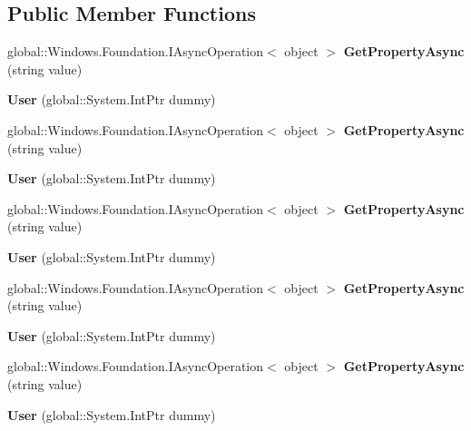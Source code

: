 \subsection*{Public Member Functions}
\begin{DoxyCompactItemize}
\item 
\mbox{\label{class_windows_1_1_system_1_1_user_a586877e8857ea94b863a3d598d77cc43}} 
global\+::\+Windows.\+Foundation.\+I\+Async\+Operation$<$ object $>$ {\bfseries Get\+Property\+Async} (string value)
\item 
\mbox{\label{class_windows_1_1_system_1_1_user_af054a009e1d372b7a8b565d790393cab}} 
{\bfseries User} (global\+::\+System.\+Int\+Ptr dummy)
\item 
\mbox{\label{class_windows_1_1_system_1_1_user_a586877e8857ea94b863a3d598d77cc43}} 
global\+::\+Windows.\+Foundation.\+I\+Async\+Operation$<$ object $>$ {\bfseries Get\+Property\+Async} (string value)
\item 
\mbox{\label{class_windows_1_1_system_1_1_user_af054a009e1d372b7a8b565d790393cab}} 
{\bfseries User} (global\+::\+System.\+Int\+Ptr dummy)
\item 
\mbox{\label{class_windows_1_1_system_1_1_user_a586877e8857ea94b863a3d598d77cc43}} 
global\+::\+Windows.\+Foundation.\+I\+Async\+Operation$<$ object $>$ {\bfseries Get\+Property\+Async} (string value)
\item 
\mbox{\label{class_windows_1_1_system_1_1_user_af054a009e1d372b7a8b565d790393cab}} 
{\bfseries User} (global\+::\+System.\+Int\+Ptr dummy)
\item 
\mbox{\label{class_windows_1_1_system_1_1_user_a586877e8857ea94b863a3d598d77cc43}} 
global\+::\+Windows.\+Foundation.\+I\+Async\+Operation$<$ object $>$ {\bfseries Get\+Property\+Async} (string value)
\item 
\mbox{\label{class_windows_1_1_system_1_1_user_af054a009e1d372b7a8b565d790393cab}} 
{\bfseries User} (global\+::\+System.\+Int\+Ptr dummy)
\item 
\mbox{\label{class_windows_1_1_system_1_1_user_a586877e8857ea94b863a3d598d77cc43}} 
global\+::\+Windows.\+Foundation.\+I\+Async\+Operation$<$ object $>$ {\bfseries Get\+Property\+Async} (string value)
\item 
\mbox{\label{class_windows_1_1_system_1_1_user_af054a009e1d372b7a8b565d790393cab}} 
{\bfseries User} (global\+::\+System.\+Int\+Ptr dummy)
\end{DoxyCompactItemize}

